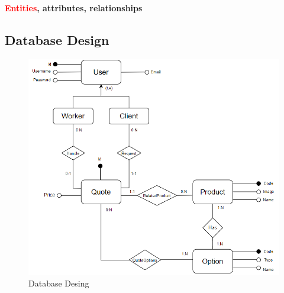 \documentclass[a4paper, 12pt]{article}
\begin{document}
\noindent \textbf{\textcolor{red}{Entities}, \textcolor{myGreen}{attributes}, \textcolor{myBlue}{relationships}}
\newpage
\subsection{Database Design} \label{sub:databaseDesign}
\begin{figure}[h!]
	\centering
	\includegraphics[width=1\textwidth]{PureHTML_images/quotemanagementdesign.png}
	\caption{Database Desing}
	\label{figure:database_design}
\end{figure}
\end{document}
